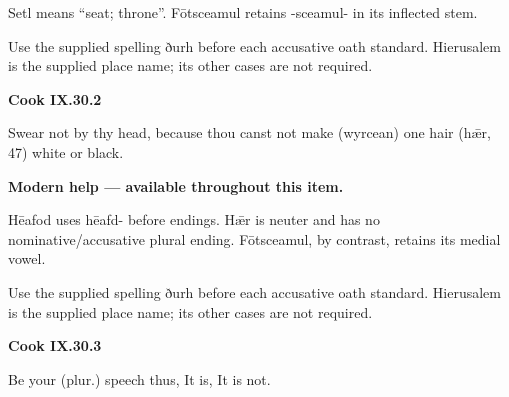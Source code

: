 Setl means “seat; throne”. Fōtsceamul retains -sceamul- in its inflected stem.

Use the supplied spelling ðurh before each accusative oath standard. Hierusalem is the supplied place name; its other cases are not required.

\par\begin{minipage}{\linewidth}\raggedright
\textbf{Cook IX.30.2}

Swear not by thy head, because thou canst not make (wyrcean) one hair (hǣr, 47) white or black.

\textbf{Modern help — available throughout this item.}

\end{minipage}\par\addvspace{4pt}

Hēafod uses hēafd- before endings. Hǣr is neuter and has no nominative/\allowbreak{}accusative plural ending. Fōtsceamul, by contrast, retains its medial vowel.

Use the supplied spelling ðurh before each accusative oath standard. Hierusalem is the supplied place name; its other cases are not required.

\par\begin{minipage}{\linewidth}\raggedright
\textbf{Cook IX.30.3}

Be your (plur.) speech thus, It is, It is not.

\end{minipage}\par\addvspace{4pt}

